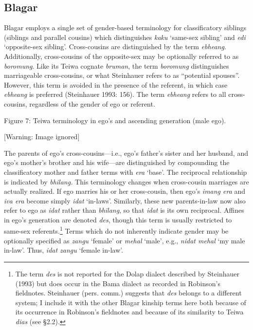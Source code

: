 \subsection[Blagar]{Blagar}
\hypertarget{RefHeading78021871885726}{}Blagar employs a single set of gender-based terminology for classificatory siblings (siblings and parallel cousins) which distinguishes \textit{kaku }{\textquoteleft}same-sex sibling{\textquoteright} and \textit{edi }{\textquoteleft}opposite-sex sibling{\textquoteright}. Cross-cousins are distinguished by the term \textit{ebheang}. Additionally, cross-cousins of the opposite-sex may be optionally referred to as \textit{boromung}. Like its Teiwa cognate \textit{bruman}, the term \textit{boromung }distinguishes marriageable cross-cousins, or what Steinhauer refers to as {\textquotedblleft}potential spouses{\textquotedblright}. However, this term is avoided in the presence of the referent, in which case \textit{ebheang }is preferred (Steinhauer 1993: 156). The term \textit{ebheang }refers to all cross-cousins, regardless of the gender of ego or referent.

{\centering
Figure 7: Teiwa terminology in ego{\textquoteright}s and ascending generation (male ego). 
\par}

  [Warning: Image ignored] %
 

The parents of ego{\textquoteright}s cross-cousins---i.e., ego{\textquoteright}s father{\textquoteright}s sister and her husband, and ego{\textquoteright}s mother{\textquoteright}s brother and his wife---are distinguished by compounding the classificatory mother and father terms with \textit{era }{\textquoteleft}base{\textquoteright}. The reciprocal relationship is indicated by \textit{bhilang. }This terminology changes when cross-cousin marriages are actually realized. If ego marries his or her cross-cousin, then ego{\textquoteright}s \textit{imang era }and \textit{iva era }become simply \textit{idat }{\textquoteleft}in-laws{\textquoteright}. Similarly, these new parents-in-law now also refer to ego as \textit{idat }rather than \textit{bhilang}, so that \textit{idat} is its own reciprocal. Affines in ego{\textquoteright}s generation are denoted \textit{des}, though this term is usually restricted to same-sex referents.\footnote{ The term \textit{des} is not reported for the Dolap dialect described by 
Steinhauer (1993) but does occur in the Bama dialect as recorded in Robinson{\textquoteright}s fieldnotes. Steinhauer (pers. comm.) suggests that \textit{des }belongs to a different system; I include it with the other Blagar kinship terms here both because of its occurrence in Robinson{\textquoteright}s fieldnotes and because of its similarity to Teiwa \textit{dias }(see {\S}2.2).} Terms which do not inherently indicate gender may be optionally specified as \textit{zangu }{\textquoteleft}female{\textquoteright} or \textit{mehal }{\textquoteleft}male{\textquoteright}, e.g., \textit{nidat mehal }{\textquoteleft}my male in-law{\textquoteright}. Thus, \textit{idat zangu} {\textquoteleft}female in-law{\textquoteright}.


